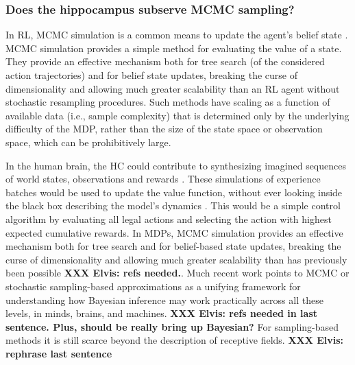 \documentclass[10pt,letterpaper]{article}
\begin{document}
\subsubsection{Does the hippocampus subserve MCMC sampling?}
In RL, MCMC simulation is a common means to update the agent's belief state
\citep{silver2010monte}.
MCMC simulation provides a simple method for evaluating the value of a state.
They provide an effective mechanism both for tree search (of the considered
action trajectories)
and for belief state updates, breaking the curse of dimensionality and allowing much greater scalability than an RL agent without stochastic resampling procedures.
Such methods have scaling as a function of available data (i.e., sample complexity) that
is determined only by the underlying difficulty of the MDP, rather than the size of the state space or observation space,
which can be prohibitively large.

In the human brain,
the HC could contribute to synthesizing imagined sequences of world states,
observations and rewards \citep{aronov2017, chao2017interaction, boyer2008evolutionary}.
These simulations of experience batches
would be used to update the value function, without ever looking inside the black box describing the model's dynamics \citep{lavilleon2015}.
This would be a simple control algorithm by evaluating all legal actions and selecting the action with
highest expected cumulative rewards.
In MDPs, MCMC simulation provides an effective mechanism both for tree search and for belief-based state updates, breaking the curse of dimensionality and allowing much greater scalability than has previously been possible
\textbf{XXX Elvis: refs needed.}.
Much recent work points to MCMC or stochastic sampling-based approximations as a unifying framework for understanding how Bayesian inference may work practically across all these levels, in minds, brains, and machines. \textbf{XXX Elvis: refs needed in last sentence. Plus, should be really bring up Bayesian?} For sampling-based methods it is still scarce
beyond the description of receptive fields. \textbf{XXX Elvis: rephrase last sentence}
\end{document}
